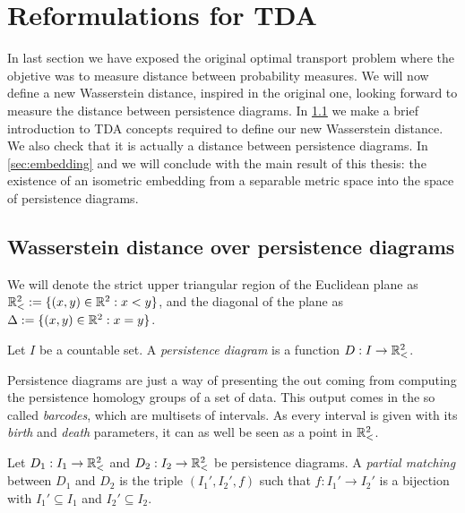 \section{Reformulations for TDA} \label{sec:tda}

In last section we have exposed the original optimal transport problem where the objetive was to measure distance between probability measures. We will now define a new Wasserstein distance, inspired in the original one, looking forward to measure the distance between persistence diagrams. In \ref{sec:wp-persistance} we make a brief introduction to TDA concepts required to define our new Wasserstein distance. We also check that it is actually a distance between persistence diagrams. In \ref{sec:embedding} and we will conclude with the main result of this thesis: the existence of an isometric embedding from a separable metric space into the space of persistence diagrams.

\subsection{Wasserstein distance over persistence diagrams} \label{sec:wp-persistance}
We will denote the strict upper triangular region of the Euclidean plane as $ \mathbb{R}_<^2 := \{(x, y) \in \mathbb R^2 : x < y\} $, and the diagonal of the plane as $ \Delta := \{(x, y) \in \mathbb R^2 : x = y\}$.

\begin{definition}
    Let $ I $ be a countable set. A {\it persistence diagram} is a function $ D: I \to \mathbb{R}_<^2 $.
\end{definition}

Persistence diagrams are just a way of presenting the out coming from computing the persistence homology groups of a set of data. This output comes in the so called {\it barcodes}, which are multisets of intervals. As every interval is given with its {\it birth} and {\it death} parameters, it can as well be seen as a point in $ \mathbb{R}_<^2 $.

\begin{definition}
    Let $ D_1: I_1 \to \mathbb{R}_<^2 $ and $ D_2: I_2 \to \mathbb{R}_<^2 $ be persistence diagrams. A {\it partial matching} between $ D_1 $ and $ D_2 $ is the triple $ (I_1', I_2', f) $ such that $ f: I_1' \to I_2' $ is a bijection with $ I_1' \subseteq I_1 $ and $ I_2' \subseteq I_2 $.
\end{definition}

